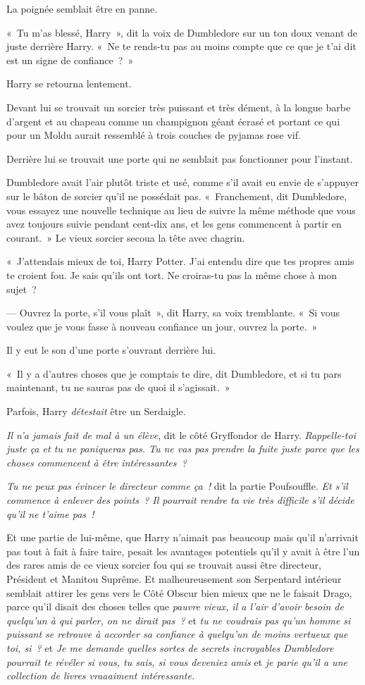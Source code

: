 La poignée semblait être en panne.

«~Tu m'as blessé, Harry~», dit la voix de Dumbledore sur un ton doux venant de juste derrière Harry.
«~Ne te rends-tu pas au moins compte que ce que je t'ai dit est un signe de confiance~?~»

Harry se retourna lentement.

Devant lui se trouvait un sorcier très puissant et très dément, à la longue barbe d'argent et au chapeau comme un champignon géant écrasé et portant ce qui pour un Moldu aurait ressemblé à trois couches de pyjamas rose vif.

Derrière lui se trouvait une porte qui ne semblait pas fonctionner pour l'instant.

Dumbledore avait l'air plutôt triste et usé, comme s'il avait eu envie de s'appuyer sur le bâton de sorcier qu'il ne possédait pas.
«~Franchement, dit Dumbledore, vous essayez une nouvelle technique au lieu de suivre la même méthode que vous avez toujours suivie pendant cent-dix ans, et les gens commencent à partir en courant.~»
Le vieux sorcier secoua la tête avec chagrin.

«~J'attendais mieux de toi, Harry Potter.
J'ai entendu dire que tes propres amis te croient fou.
Je sais qu'ils ont tort.
Ne croiras-tu pas la même chose à mon sujet~?

--- Ouvrez la porte, s'il vous plaît~», dit Harry, sa voix tremblante.
«~Si vous voulez que je vous fasse à nouveau confiance un jour, ouvrez la porte.~»

Il y eut le son d'une porte s'ouvrant derrière lui.

«~Il y a d'autres choses que je comptais te dire, dit Dumbledore, et si tu pars maintenant, tu ne sauras pas de quoi il s'agissait.~»

Parfois, Harry \emph{détestait} être un Serdaigle.

\emph{Il n'a jamais fait de mal à un élève}, dit le côté Gryffondor de Harry.
\emph{Rappelle-toi juste ça et tu ne paniqueras pas.
Tu ne vas pas prendre la fuite juste parce que les choses commencent à être intéressantes~?}

\emph{Tu ne peux pas évincer le directeur comme ça~!} dit la partie Poufsouffle.
\emph{Et s'il commence à enlever des points~?
Il pourrait rendre ta vie très difficile s'il décide qu'il ne t'aime pas~!}

Et une partie de lui-même, que Harry n'aimait pas beaucoup mais qu'il n'arrivait pas tout à fait à faire taire, pesait les avantages potentiels qu'il y avait à être l'un des rares amis de ce vieux sorcier fou qui se trouvait aussi être directeur, Président et Manitou Suprême.
Et malheureusement son Serpentard intérieur semblait attirer les gens vers le Côté Obscur bien mieux que ne le faisait Drago, parce qu'il disait des choses telles que \emph{pauvre vieux, il a l'air d'avoir besoin de quelqu'un à qui parler, on ne dirait pas~?} et \emph{tu ne voudrais pas qu'un homme si puissant se retrouve à accorder sa confiance à quelqu'un de moins vertueux que toi, si~?} et \emph{Je me demande quelles sortes de secrets incroyables Dumbledore pourrait te révéler si vous, tu sais, si vous deveniez amis} et \emph{je parie qu'il a une collection de livres vraaaiment intéressante.}

